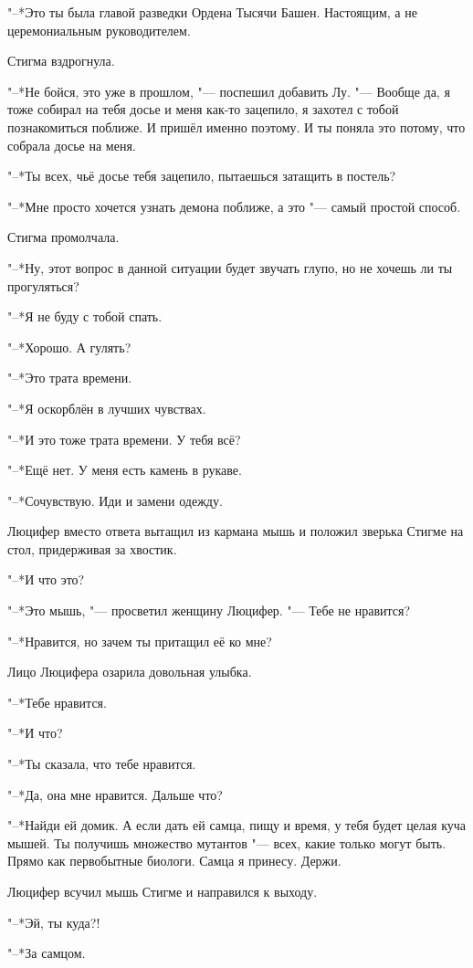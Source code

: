 "--*Это ты была главой разведки Ордена Тысячи Башен.
Настоящим, а не церемониальным руководителем.

Стигма вздрогнула.

"--*Не бойся, это уже в прошлом, "--- поспешил добавить Лу.
"--- Вообще да, я тоже собирал на тебя досье и меня как-то зацепило, я захотел с тобой познакомиться поближе.
И пришёл именно поэтому.
И ты поняла это потому, что собрала досье на меня.

"--*Ты всех, чьё досье тебя зацепило, пытаешься затащить в постель?

"--*Мне просто хочется узнать демона поближе, а это "--- самый простой способ.

Стигма промолчала.

"--*Ну, этот вопрос в данной ситуации будет звучать глупо, но не хочешь ли ты прогуляться?

"--*Я не буду с тобой спать.

"--*Хорошо.
А гулять?

"--*Это трата времени.

"--*Я оскорблён в лучших чувствах.

"--*И это тоже трата времени.
У тебя всё?

"--*Ещё нет.
У меня есть камень в рукаве.

"--*Сочувствую.
Иди и замени одежду.

Люцифер вместо ответа вытащил из кармана мышь и положил зверька Стигме на стол, придерживая за хвостик.

"--*И что это?

"--*Это мышь, "--- просветил женщину Люцифер.
"--- Тебе не нравится?

"--*Нравится, но зачем ты притащил её ко мне?

Лицо Люцифера озарила довольная улыбка.

"--*Тебе нравится.

"--*И что?

"--*Ты сказала, что тебе нравится.

"--*Да, она мне нравится.
Дальше что?

"--*Найди ей домик.
А если дать ей самца, пищу и время, у тебя будет целая куча мышей.
Ты получишь множество мутантов "--- всех, какие только могут быть.
Прямо как первобытные биологи.
Самца я принесу.
Держи.

Люцифер всучил мышь Стигме и направился к выходу.

"--*Эй, ты куда?!

"--*За самцом.


